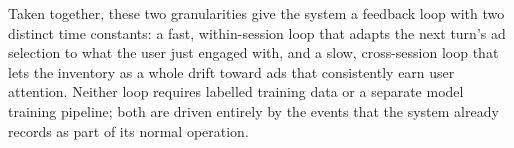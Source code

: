 Taken together, these two granularities give the system a feedback loop
with two distinct time constants: a fast, within-session loop that adapts
the next turn's ad selection to what the user just engaged with, and a
slow, cross-session loop that lets the inventory as a whole drift toward
ads that consistently earn user attention. Neither loop requires
labelled training data or a separate model training pipeline; both are
driven entirely by the events that the system already records as part of
its normal operation.